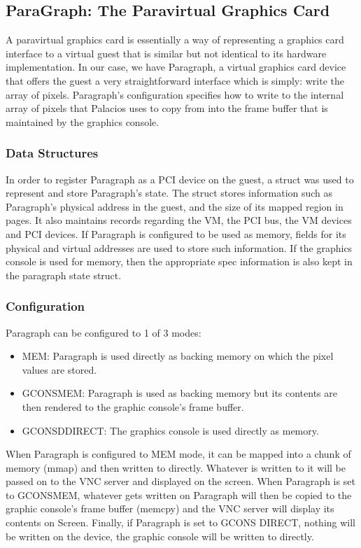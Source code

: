 \documentclass{acm_proc_article-sp}
\begin{document}
\subsection{ParaGraph: The Paravirtual Graphics Card}
A paravirtual graphics card is essentially a way of representing a graphics card
interface to a virtual guest that is similar but not identical to its hardware
implementation. In our case, we have Paragraph, a virtual graphics card device
that offers the guest a very straightforward interface which is simply: write
the array of pixels. Paragraph's configuration specifies how to write to the
internal array of pixels that Palacios uses to copy from into the frame buffer
that is maintained by the graphics console. \\
\subsubsection{Data Structures}
In order to register Paragraph as a PCI device on the guest, a struct was used
to represent and store Paragraph's state. The struct stores information such as
Paragraph's physical address in the guest, and the size of its mapped region in
pages. It also maintains records regarding the VM, the PCI bus, the VM devices and PCI
devices. If Paragraph is configured to be used as memory, fields for its
physical and virtual addresses are used to store such information. If the
graphics console is used for memory, then the appropriate spec information is
also kept in the paragraph state struct. 
\subsubsection{Configuration}
Paragraph can be configured to 1 of 3 modes: \\
\begin{itemize}
\item MEM: Paragraph is used directly as backing memory on which the pixel values
are stored.
\item GCONS\textunderscore MEM: Paragraph is used as backing memory but its contents are
then rendered to the graphic console's frame buffer.
\item GCONSD\textunderscore DIRECT: The graphics console is used directly as memory.
\end{itemize}
When Paragraph is configured to MEM mode, it can be mapped into a chunk of
memory (mmap) and then written to directly. Whatever is written to it will be
passed on to the VNC server and displayed on the screen. When Paragraph is set
to GCONS\textunderscore MEM, whatever gets written on Paragraph will then be
copied to the graphic console's frame buffer (memcpy) and the VNC server will
display its contents on Screen. Finally, if Paragraph is set to GCONS
\textunderscore DIRECT, nothing will be written on the device, the graphic
console will be written to directly.
\end{document}
